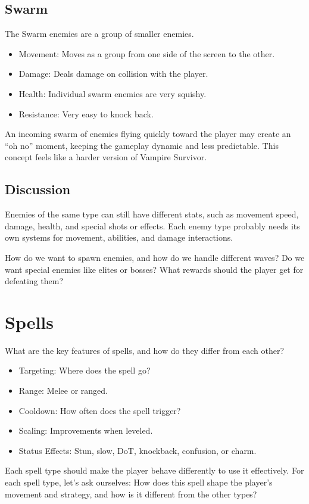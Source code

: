 \documentclass[12pt]{article}
\begin{document}
\subsection{Swarm}
The Swarm enemies are a group of smaller enemies.
\begin{itemize}
    \item Movement: Moves as a group from one side of the screen to the other. 
    \item Damage: Deals damage on collision with the player.
    \item Health: Individual swarm enemies are very squishy. 
    \item Resistance: Very easy to knock back. 
\end{itemize}
An incoming swarm of enemies flying quickly toward the player may create an “oh no” moment, keeping the gameplay dynamic and less predictable. This concept feels like a harder version of Vampire Survivor. 

\subsection{Discussion}
Enemies of the same type can still have different stats, such as movement speed, damage, health, and special shots or effects. Each enemy type probably needs its own systems for movement, abilities, and damage interactions. 

How do we want to spawn enemies, and how do we handle different waves? Do we want special enemies like elites or bosses? What rewards should the player get for defeating them?

\newpage
\section{Spells}
What are the key features of spells, and how do they differ from each other? 
\begin{itemize}    
    \item Targeting: Where does the spell go?
    \item Range: Melee or ranged. 
    \item Cooldown: How often does the spell trigger?
    \item Scaling: Improvements when leveled.
    \item Status Effects: Stun, slow, DoT, knockback, confusion, or charm.
\end{itemize}

Each spell type should make the player behave differently to use it effectively.  
For each spell type, let's ask ourselves: How does this spell shape the player's movement and strategy, and how is it different from the other types?\\
\end{document}
